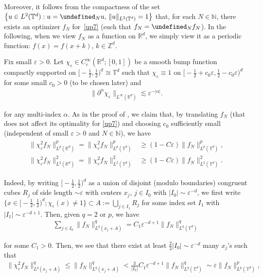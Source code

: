 \documentclass[letterpaper, 11pt,  reqno]{amsart}
\newcommand{\noi}{\noindent}
\newcommand{\Z}{\mathbb{Z}}
\newcommand{\R}{\mathbb{R}}
\newcommand{\T}{\mathbb{T}}
\let\P= \undefined
\newcommand{\P}{\mathbf{P}}
\newcommand{\al}{\alpha}
\newcommand{\eps}{\varepsilon}
\newcommand{\les}{\lesssim}
\newcommand{\N}{\mathbb{N}}
\numberwithin{equation}{section}
\numberwithin{theorem}{section}
\begin{document}
\noi
Moreover, 
it follows from 
 the compactness of the  set $\big\{u \in L^2(\T^d): u = \P_Nu, \, \|u\|_{L^{2}(\T^d)}=  1\big\}$
 that,  
for each $N \in \N$, 
there exists an optimizer $f_N$
for~\eqref{up7} (such that $f_N = \P_N f_N$).
In the following, when we view $f_N$ as a function on $\R^d$, we simply view it
as a periodic function: $f (x) = f (x + k)$, $k \in \Z^d$.







Fix small $\eps>0$. Let $\chi_{\eps}\in C_c^{\infty}(\R^d;[0,1])$ be a smooth bump function
compactly supported on $\big[-\tfrac 12 ,\tfrac 12 \big)^d\cong \T^d$
such that $\chi_{\eps}\equiv1$ on 
$\big[-\frac 12 + c_0 \eps ,\frac 12 - c_0 \eps \big)^d$
 for some small $c_0>0$
(to be chosen later) 
and
\begin{align}
\|\partial^{\alpha}\chi_{\eps}\|_{L^{\infty}(\R^d)}\les \eps^{-|\alpha|}.
\label{chi1}
\end{align}


\noi
for any multi-index $\al$.
As in the proof of \cite[Lemma 2.2]{OST}, 
we claim that, 
by translating $f_N$ (that does not affect its optimality for \eqref{up7}) and choosing $c_0$ sufficiently small (independent of small
$\eps > 0$ and $N\in \N$), we have
\begin{align}
\begin{split}
 \|\chi^2_{\eps}f_N\|_{L^{p}(\R^d)}^p = \|\chi^2_{\eps}f_N\|_{L^{p}(\T^d)}^p&\ge (1-C\eps)\|f_N\|_{L^{p}(\T^d)}^p,
\\
\|\chi^2_{\eps}f_N\|_{L^{2}(\R^d)}^2
= 
\|\chi^2_{\eps}f_N\|_{L^{2}(\T^d)}^2&\ge (1- C\eps)\|f_N\|_{L^{2}(\T^d)}^2.
\end{split}
\label{chi2}
\end{align}

\noi
Indeed, by writing 
$\big[-\frac 12 ,\frac 12 \big)^d$
as a union of  disjoint (modulo boundaries)
congruent cubes $R_j$ of side length $\sim \eps$
with centers $x_j$, $j \in I_0$ with $|I_0| \sim \eps^{-d}$, 
we first write
$\big \{x \in \big[-\frac 12 ,\frac 12 \big)^d; \chi_\eps(x) \ne 1\big\} \subset A:= \bigcup_{j \in I_1} R_j$
for some index set $I_1$ with $|I_1| \sim \eps^{-d+1}$.
Then, given $q = 2$ or $p$, we have
\begin{align*}
\sum_{j \in I_0} \| f_N \|_{L^q(x_j + A)}^q
= C_1  \eps^{-d+1} \|f_N\|_{L^q(\T^d)}^q
\end{align*}

\noi
for some $C_1 > 0$.
Then, 
we see that there exist at least $\frac 23 |I_0| \sim \eps^{-d}$ many $x_j$'s
such that 
\begin{align}
\| \chi_\eps^2 f_N \|_{L^q(x_j + A)}^q \le \| f_N \|_{L^q(x_j + A)}^q
 < \frac 3{|I_0|}
C_1 \eps^{-d+1} \|f_N\|_{L^q(\T^d)}^q
\sim 
\eps \|f_N\|_{L^p(\T^d)}^p,
\label{chi2a}
\end{align}
\end{document}
